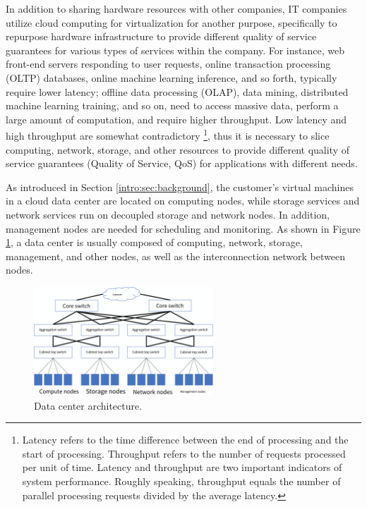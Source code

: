 In addition to sharing hardware resources with other companies, IT companies utilize cloud computing for virtualization for another purpose, specifically to repurpose hardware infrastructure to provide different quality of service guarantees for various types of services within the company. For instance, web front-end servers responding to user requests, online transaction processing (OLTP) databases, online machine learning inference, and so forth, typically require lower latency; offline data processing (OLAP), data mining, distributed machine learning training, and so on, need to access massive data, perform a large amount of computation, and require higher throughput. Low latency and high throughput are somewhat contradictory \footnote{Latency refers to the time difference between the end of processing and the start of processing. Throughput refers to the number of requests processed per unit of time. Latency and throughput are two important indicators of system performance. Roughly speaking, throughput equals the number of parallel processing requests divided by the average latency.}, thus it is necessary to slice computing, network, storage, and other resources to provide different quality of service guarantees (Quality of Service, QoS) for applications with different needs.

As introduced in Section \ref{intro:sec:background}, the customer's virtual machines in a cloud data center are located on computing nodes, while storage services and network services run on decoupled storage and network nodes. In addition, management nodes are needed for scheduling and monitoring. As shown in Figure \ref{background:fig:cloud-architecture}, a data center is usually composed of computing, network, storage, management, and other nodes, as well as the interconnection network between nodes.

\begin{figure}[htbp]
	\centering
	\includegraphics[width=0.6\textwidth]{figures/DC_arch.pdf}
	\caption{Data center architecture.}
	\label{background:fig:cloud-architecture}
\end{figure}

